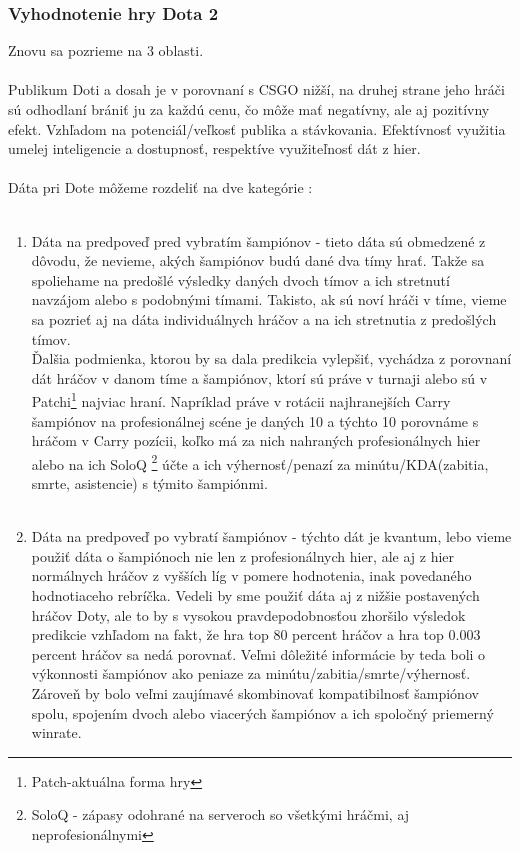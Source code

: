 \subsubsection{Vyhodnotenie hry Dota 2}
Znovu sa pozrieme na 3 oblasti. \\ \\ 
Publikum Doti a dosah je v porovnaní s CSGO nižší, na druhej strane jeho hráči sú odhodlaní brániť ju za každú cenu, čo môže mať negatívny, ale aj pozitívny efekt. Vzhľadom na  potenciál/veľkosť publika a stávkovania. Efektívnosť využitia umelej inteligencie a dostupnosť, respektíve využiteľnosť dát z hier.
\\ \\
Dáta pri Dote môžeme rozdeliť na dve kategórie : 
\\ \\
\begin{enumerate}
\item Dáta na predpoveď pred vybratím šampiónov - tieto dáta sú obmedzené z dôvodu, že nevieme, akých šampiónov budú dané dva tímy hrať. Takže sa spoliehame na predošlé výsledky daných dvoch tímov a ich stretnutí navzájom alebo s podobnými tímami. Takisto, ak sú noví hráči v tíme, vieme sa pozrieť aj na dáta individuálnych hráčov a na ich stretnutia z predošlých tímov. \\
Ďalšia podmienka, ktorou by sa dala predikcia vylepšiť, vychádza z porovnaní dát hráčov v danom tíme a šampiónov, ktorí sú práve v turnaji alebo sú v Patchi\footnote {
	Patch-aktuálna forma hry
} najviac hraní. Napríklad práve v rotácii najhranejších Carry šampiónov na profesionálnej scéne je daných 10 a týchto 10 porovnáme s hráčom v Carry pozícii, koľko má za nich nahraných profesionálnych hier alebo na ich SoloQ \footnote {
	SoloQ - zápasy odohrané na serveroch so všetkými hráčmi, aj neprofesionálnymi
} účte a ich výhernosť/penazí za minútu/KDA(zabitia, smrte, asistencie) s týmito šampiónmi.  
\\ \\
\item Dáta na predpoveď po vybratí šampiónov - týchto dát je kvantum, lebo vieme použiť dáta o šampiónoch nie len z profesionálnych hier, ale aj z hier normálnych hráčov z vyšších líg v pomere hodnotenia, inak povedaného hodnotiaceho rebríčka. Vedeli by sme použiť dáta aj z nižšie postavených hráčov Doty, ale to by s vysokou pravdepodobnosťou zhoršilo výsledok predikcie vzhľadom na fakt, že hra top 80 percent hráčov a hra top 0.003 percent hráčov sa nedá porovnať. Veľmi dôležité informácie by teda boli o výkonnosti šampiónov ako peniaze za minútu/zabitia/smrte/výhernosť. Zároveň by bolo veľmi zaujímavé skombinovať kompatibilnosť šampiónov spolu, spojením dvoch alebo viacerých šampiónov a ich spoločný priemerný winrate.
\end{enumerate}

